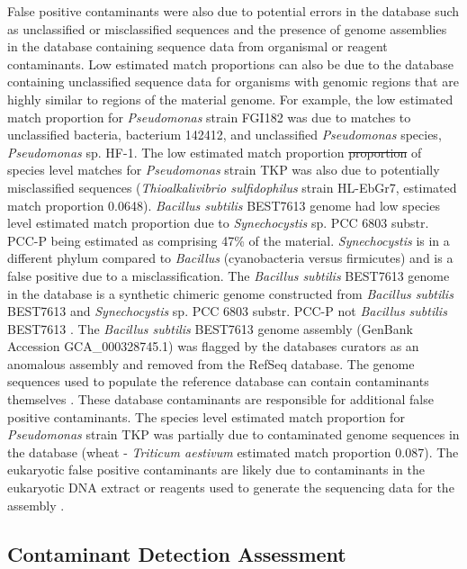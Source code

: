 \documentclass[fleqn,10pt,lineno]{wlpeerj}\usepackage[]{graphicx}\usepackage[]{color}
\providecommand{\DIFdeltex}[1]{{\protect\color{red}\sout{#1}}}                      %
\providecommand{\DIFdelbegin}{} %
\providecommand{\DIFdelend}{} %
\providecommand{\DIFdel}[1]{\texorpdfstring{\DIFdeltex{#1}}{}} %
\begin{document}
False positive contaminants were also due to potential errors in the database such as unclassified or misclassified sequences and the presence of genome assemblies in the database containing sequence data from organismal or reagent contaminants.
Low estimated match proportions can also be due to the database containing unclassified sequence data for organisms with genomic regions that are highly similar to regions of the material genome.
For example, the low estimated match proportion for \textit{Pseudomonas} strain FGI182 was due to matches to unclassified bacteria, bacterium 142412, and unclassified \textit{Pseudomonas} species, \textit{Pseudomonas} sp. HF-1.
The low estimated match proportion \DIFdelbegin \DIFdel{proportion }\DIFdelend of species level matches for \textit{Pseudomonas} strain TKP was also due to potentially misclassified sequences (\textit{Thioalkalivibrio sulfidophilus} strain HL-EbGr7, estimated match proportion 0.0648).
\textit{Bacillus subtilis} BEST7613 genome had low species level estimated match proportion due to \textit{Synechocystis} sp. PCC 6803 substr. PCC-P being estimated as comprising 47\% of the material.
\textit{Synechocystis} is in a different phylum compared to \textit{Bacillus} (cyanobacteria versus firmicutes) and is a false positive due to a misclassification.
The \textit{Bacillus subtilis} BEST7613 genome in the database is a synthetic chimeric genome constructed from \textit{Bacillus subtilis} BEST7613 and \textit{Synechocystis} sp. PCC 6803 substr. PCC-P not \textit{Bacillus subtilis} BEST7613 \citep{watanabe2012complete}. 
The \textit{Bacillus subtilis} BEST7613 genome assembly (GenBank Accession GCA\_000328745.1) was flagged by the databases curators as an anomalous assembly and removed from the RefSeq database.  
The genome sequences used to populate the reference database can contain contaminants themselves \citep{parks2015checkm}.
These database contaminants are responsible for additional false positive contaminants.
The species level estimated match proportion for \textit{Pseudomonas} strain TKP was partially due to contaminated genome sequences in the database (wheat - \textit{Triticum aestivum} estimated match proportion 0.087).
The eukaryotic false positive contaminants are likely due to contaminants in the eukaryotic DNA extract or reagents used to generate the sequencing data for the assembly \citep{parks2015checkm}.

\subsection*{Contaminant Detection Assessment}
\end{document}
